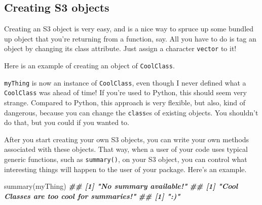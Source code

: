 \documentclass[
  12pt,
  krantz2]{krantz}
\makeatletter
\newenvironment{Shaded}{\begin{snugshade}}{\end{snugshade}}
\newcommand{\CommentTok}[1]{\textcolor[rgb]{0.37,0.37,0.37}{\textit{#1}}}
\newcommand{\DecValTok}[1]{\textcolor[rgb]{0.06,0.06,0.06}{#1}}
\newcommand{\DocumentationTok}[1]{\textcolor[rgb]{0.37,0.37,0.37}{\textbf{\textit{#1}}}}
\newcommand{\FunctionTok}[1]{\textcolor[rgb]{0,0,0}{#1}}
\newcommand{\NormalTok}[1]{#1}
\newcommand{\OtherTok}[1]{\textcolor[rgb]{0.37,0.37,0.37}{#1}}
\newcommand{\SpecialCharTok}[1]{\textcolor[rgb]{0,0,0}{#1}}
\newcommand{\StringTok}[1]{\textcolor[rgb]{0.5,0.5,0.5}{#1}}
\newenvironment{kframe}{%
\medskip{}
\setlength{\fboxsep}{.8em}
 \def\at@end@of@kframe{}%
 \ifinner\ifhmode%
  \def\at@end@of@kframe{\end{minipage}}%
  \begin{minipage}{\columnwidth}%
 \fi\fi%
 \def\FrameCommand##1{\hskip\@totalleftmargin \hskip-\fboxsep
 \colorbox{shadecolor}{##1}\hskip-\fboxsep
     \hskip-\linewidth \hskip-\@totalleftmargin \hskip\columnwidth}%
 \MakeFramed {\advance\hsize-\width
   \@totalleftmargin\z@ \linewidth\hsize
   \@setminipage}}%
 {\par\unskip\endMakeFramed%
 \at@end@of@kframe}
\renewenvironment{Shaded}{\begin{kframe}}{\end{kframe}}
\makeatother
\begin{document}
\hypertarget{creating-s3-objects}{%
\subsection{Creating S3 objects}\label{creating-s3-objects}}

Creating an S3 object is very easy, and is a nice way to spruce up some bundled up object that you're returning from a function, say. All you have to do is tag an object by changing its class attribute. Just assign a character \texttt{vector} to it!

Here is an example of creating an object of \texttt{CoolClass}.

\begin{Shaded}
\end{Shaded}

\texttt{myThing} is now an instance of \texttt{CoolClass}, even though I never defined what a \texttt{CoolClass} was ahead of time! If you're used to Python, this should seem very strange. Compared to Python, this approach is very flexible, but also, kind of dangerous, because you can change the \texttt{class}es of existing objects. You shouldn't do that, but you could if you wanted to.

After you start creating your own S3 objects, you can write your own methods associated with these objects. That way, when a user of your code uses typical generic functions, such as \texttt{summary()}, on your S3 object, you can control what interesting things will happen to the user of your package. Here's an example.

\begin{Shaded}
\begin{Highlighting}[]
\FunctionTok{summary}\NormalTok{(myThing)}
\DocumentationTok{\#\# [1] "No summary available!"}
\DocumentationTok{\#\# [1] "Cool Classes are too cool for summaries!"}
\DocumentationTok{\#\# [1] ":)"}
\end{Highlighting}
\end{Shaded}
\end{document}
